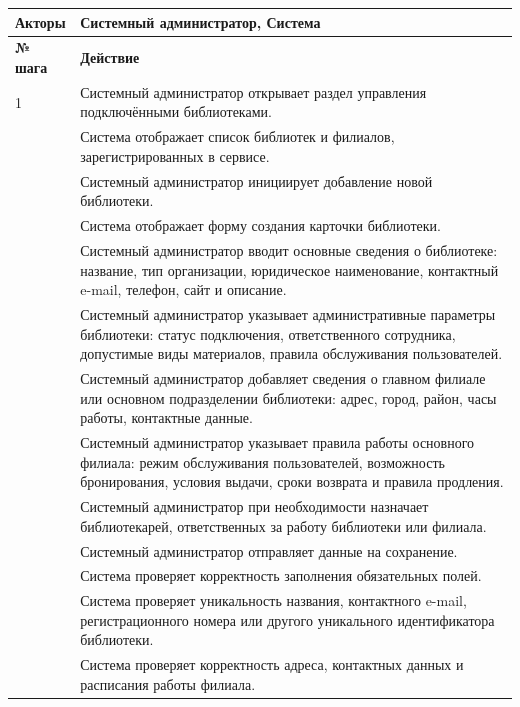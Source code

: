 \documentclass[12pt,a4paper]{article}
\begin{document}
\begin{xltabular}{\textwidth}{
				|>{\raggedright\arraybackslash}p{2.7cm}
				|>{\raggedright\arraybackslash}X|
			}
			\textbf{Акторы} &
			Системный администратор, Система \\
			\hline
			
			
			\textbf{№ шага} & \textbf{Действие} \\
			\hline
			
			1 & Системный администратор открывает раздел управления подключёнными
			библиотеками. \\
			 & Система отображает список библиотек и филиалов, зарегистрированных
			в сервисе. \\
			 & Системный администратор инициирует добавление новой библиотеки. \\
			 & Система отображает форму создания карточки библиотеки. \\
			 & Системный администратор вводит основные сведения о библиотеке:
			название, тип организации, юридическое наименование, контактный
			e-mail, телефон, сайт и описание. \\
			 & Системный администратор указывает административные параметры
			библиотеки: статус подключения, ответственного сотрудника,
			допустимые виды материалов, правила обслуживания пользователей. \\
			 & Системный администратор добавляет сведения о главном филиале или
			основном подразделении библиотеки: адрес, город, район, часы работы,
			контактные данные. \\
			 & Системный администратор указывает правила работы основного филиала:
			режим обслуживания пользователей, возможность бронирования,
			условия выдачи, сроки возврата и правила продления. \\
			 & Системный администратор при необходимости назначает библиотекарей,
			ответственных за работу библиотеки или филиала. \\
			 & Системный администратор отправляет данные на сохранение. \\
			 & Система проверяет корректность заполнения обязательных полей. \\
			 & Система проверяет уникальность названия, контактного e-mail,
			регистрационного номера или другого уникального идентификатора
			библиотеки. \\
			 & Система проверяет корректность адреса, контактных данных и расписания
			работы филиала. \\
			\hline

\end{xltabular}
\end{document}
